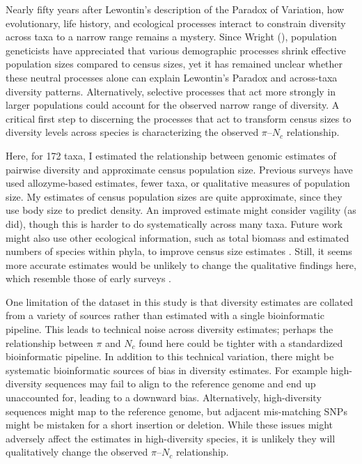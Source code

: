 \documentclass[11pt]{article}
\begin{document}
Nearly fifty years after Lewontin's description of the Paradox of Variation,
how evolutionary, life history, and ecological processes interact to constrain
diversity across taxa to a narrow range remains a mystery.  Since Wright
(\citeyear{Wright1931-fl,Wright1938-tv}), population geneticists have
appreciated that various demographic processes shrink effective population
sizes compared to census sizes, yet it has remained unclear whether these
neutral processes alone can explain Lewontin's Paradox and across-taxa
diversity patterns. Alternatively, selective processes that act more strongly
in larger populations could account for the observed narrow range of diversity.
A critical first step to discerning the processes that act to transform census
sizes to diversity levels across species is characterizing the observed
$\pi$--$N_c$ relationship.

Here, for 172 taxa, I estimated the relationship between genomic estimates of
pairwise diversity and approximate census population size. Previous surveys
have used allozyme-based estimates, fewer taxa, or qualitative measures of
population size. My estimates of census population sizes are quite approximate,
since they use body size to predict density. An improved estimate might
consider vagility (as \cite{Soule1976-he} did), though this is harder to do
systematically across many taxa. Future work might also use other ecological
information, such as total biomass and estimated numbers of species within
phyla, to improve census size estimates \parencite{Bar-On2018-kc, Mora2011-wm}.
Still, it seems more accurate estimates would be unlikely to change the
qualitative findings here, which resemble those of early surveys
\parencite{Nei1984-zi,Soule1976-he}.

One limitation of the dataset in this study is that diversity estimates are
collated from a variety of sources rather than estimated with a single
bioinformatic pipeline. This leads to technical noise across diversity
estimates; perhaps the relationship between $\pi$ and $N_c$ found here could be
tighter with a standardized bioinformatic pipeline. In addition to this
technical variation, there might be systematic bioinformatic sources of bias in
diversity estimates. For example high-diversity sequences may fail to align to
the reference genome and end up unaccounted for, leading to a downward bias.
Alternatively, high-diversity sequences might map to the reference genome, but
adjacent mis-matching SNPs might be mistaken for a short insertion or deletion.
While these issues might adversely affect the estimates in high-diversity
species, it is unlikely they will qualitatively change the observed
$\pi$--$N_c$ relationship.
\end{document}
